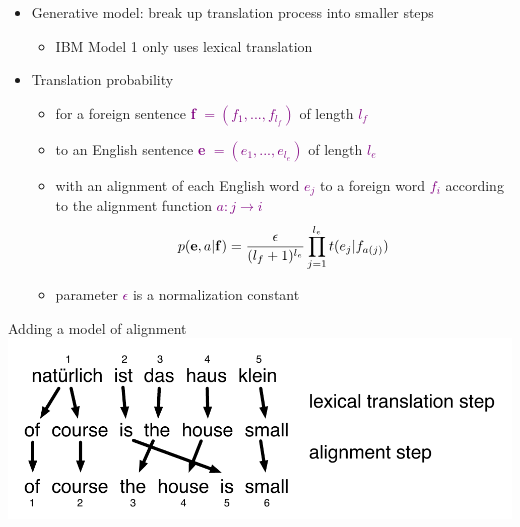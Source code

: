\documentclass[landscape]{slides}
\newcommand{\maths}[1]{\textcolor{purple}{#1}}
\begin{document}
\begin{itemize}
\item Generative model: break up translation process into smaller steps
\begin{itemize} \vspace{-3mm}
\item IBM Model 1 only uses lexical translation
\end{itemize} 
\item Translation probability 
\begin{itemize} \vspace{-3mm}
\item for a foreign sentence \maths{{\bf f} $= (f_1, ..., f_{l_f})$} of length  \maths{$l_f$}
\item to an English sentence  \maths{{\bf e} $= (e_1, ..., e_{l_e})$} of length  \maths{$l_e$} 
\item with an alignment of each English word  \maths{$e_j$} to a foreign word  \maths{$f_i$} according to the alignment function  \maths{$a: j \rightarrow i$}
 \maths{\begin{equation*}
p({\bf e},a|{\bf f}) = 
\frac{\epsilon}{(l_f+1)^{l_e}} \prod_{j=1}^{l_e} t(e_j|f_{a(j)})
\end{equation*}}
\item parameter  \maths{$\epsilon$} is a normalization constant
\end{itemize}
\end{itemize}


\vspace{20mm}
\begin{center} 
Adding a model of alignment\\[10mm]
\includegraphics[scale=1.3]{natuerlich-haus-klein-model2.pdf}
\end{center}
\end{document}
